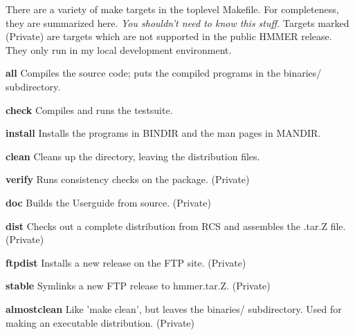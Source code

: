 There are a variety of make targets in the toplevel Makefile.  For
completeness, they are summarized here. \textit{You shouldn't need to
know this stuff.} Targets marked (Private) are targets which are not
supported in the public HMMER release. They only run in my local
development environment.

\begin{wideitem}
\item[\textbf{all}]  Compiles the source code; puts the compiled
programs in the binaries/ subdirectory.
 
\item[\textbf{check}]  Compiles and runs the testsuite.

\item[\textbf{install}] Installs the programs in BINDIR and
the man pages in MANDIR.

\item[\textbf{clean}] Cleans up the directory, leaving the
distribution files.

\item[\textbf{verify}] Runs consistency checks on the package.
(Private)

\item[\textbf{doc}] Builds the Userguide from \latex source. (Private)

\item[\textbf{dist}] Checks out a complete distribution from RCS
and assembles the .tar.Z file. (Private)

\item[\textbf{ftpdist}] Installs a new release on the FTP
site. (Private)

\item[\textbf{stable}] Symlinks a new FTP release to hmmer.tar.Z. (Private)

\item[\textbf{almostclean}] Like 'make clean', but leaves the
binaries/ subdirectory. Used for making an executable distribution.
(Private)
\end{wideitem}







